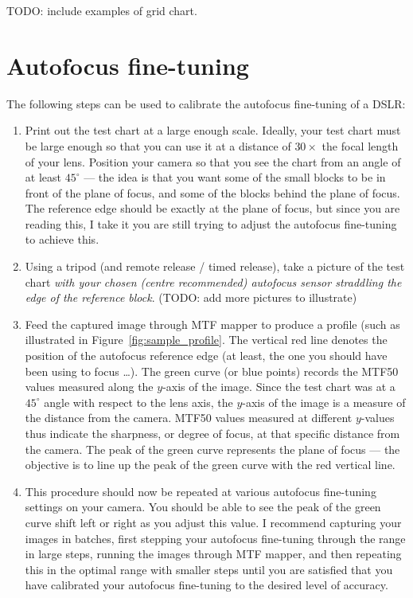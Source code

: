 \documentclass[a4paper]{article}
\begin{document}
TODO: include examples of grid chart.



\section{Autofocus fine-tuning}
\label{sec:autofocus}
The following steps can be used to calibrate the autofocus fine-tuning of a
DSLR:
\begin{enumerate}
    \item Print out the test chart at a large enough scale. Ideally, your
test chart must be large enough so that you can use it at a distance of
$30\times$ the focal length of your lens. Position your camera so that you
see the chart from an angle of at least $45^\circ$ --- the idea is that you
want some of the small blocks to be in front of the plane of focus, and some
of the blocks behind the plane of focus. The reference edge should be
exactly at the plane of focus, but since you are reading this, I take it you
are still trying to adjust the autofocus fine-tuning to achieve this.
    \item Using a tripod (and remote release / timed release), take a
picture of the test chart \emph{with your chosen (centre recommended)
autofocus sensor straddling the edge of the reference block}. (TODO: add more
pictures to illustrate)
    \item Feed the captured image through MTF mapper to produce a profile
(such as illustrated in Figure~\ref{fig:sample_profile}. The vertical red
line denotes the position of the autofocus reference edge (at least, the one
you should have been using to focus \ldots). The green curve (or blue
points) records the MTF50 values measured along the $y$-axis of the image.
Since the test chart was at a $45^\circ$ angle with respect to the lens
axis, the $y$-axis of the image is a measure of the distance from the
camera. MTF50 values measured at different $y$-values thus indicate the
sharpness, or degree of focus, at that specific distance from the camera.
The peak of the green curve represents the plane of focus --- the objective
is to line up the peak of the green curve with the red vertical line.
    \item This procedure should now be repeated at various autofocus
fine-tuning settings on your camera. You should be able to see the peak of
the green curve shift left or right as you adjust this value. I recommend
capturing your images in batches, first stepping your autofocus fine-tuning
through the range in large steps, running the images through MTF mapper, and
then repeating this in the optimal range with smaller steps until you are
satisfied that you have calibrated your autofocus fine-tuning to the desired
level of accuracy.
\end{enumerate}
\end{document}
